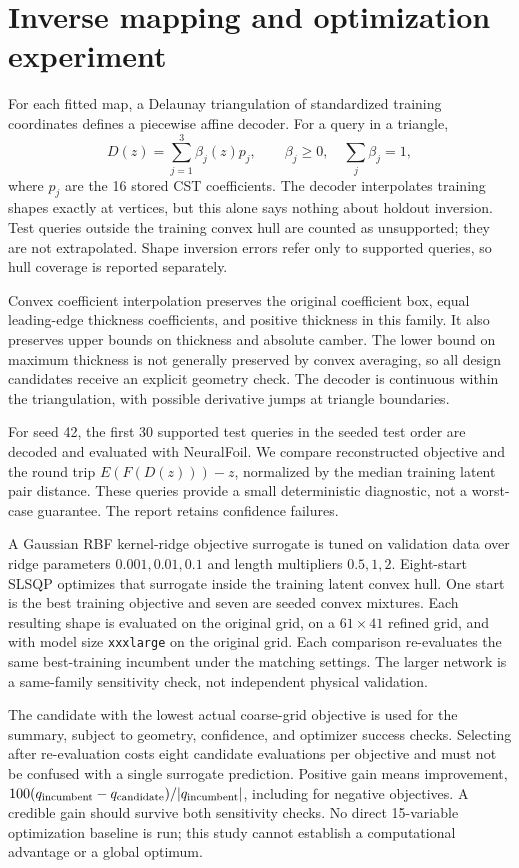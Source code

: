 \documentclass[11pt,a4paper]{article}
\begin{document}
\section{Inverse mapping and optimization experiment}
For each fitted map, a Delaunay triangulation of standardized training coordinates defines a piecewise affine decoder. For a query in a triangle,
\[
 D(z)=\sum_{j=1}^{3}\beta_j(z)p_j,\qquad \beta_j\geq0,\quad\sum_j\beta_j=1,
\]
where $p_j$ are the 16 stored CST coefficients. The decoder interpolates training shapes exactly at vertices, but this alone says nothing about holdout inversion. Test queries outside the training convex hull are counted as unsupported; they are not extrapolated. Shape inversion errors refer only to supported queries, so hull coverage is reported separately.

Convex coefficient interpolation preserves the original coefficient box, equal leading-edge thickness coefficients, and positive thickness in this family. It also preserves upper bounds on thickness and absolute camber. The lower bound on maximum thickness is not generally preserved by convex averaging, so all design candidates receive an explicit geometry check. The decoder is continuous within the triangulation, with possible derivative jumps at triangle boundaries.

For seed 42, the first 30 supported test queries in the seeded test order are decoded and evaluated with NeuralFoil. We compare reconstructed objective and the round trip $E(F(D(z)))-z$, normalized by the median training latent pair distance. These queries provide a small deterministic diagnostic, not a worst-case guarantee. The report retains confidence failures.

A Gaussian RBF kernel-ridge objective surrogate is tuned on validation data over ridge parameters $0.001,0.01,0.1$ and length multipliers $0.5,1,2$. Eight-start SLSQP optimizes that surrogate inside the training latent convex hull. One start is the best training objective and seven are seeded convex mixtures. Each resulting shape is evaluated on the original grid, on a $61\times41$ refined grid, and with model size \texttt{xxxlarge} on the original grid. Each comparison re-evaluates the same best-training incumbent under the matching settings. The larger network is a same-family sensitivity check, not independent physical validation.

The candidate with the lowest actual coarse-grid objective is used for the summary, subject to geometry, confidence, and optimizer success checks. Selecting after re-evaluation costs eight candidate evaluations per objective and must not be confused with a single surrogate prediction. Positive gain means improvement, $100(q_{\rm incumbent}-q_{\rm candidate})/|q_{\rm incumbent}|$, including for negative objectives. A credible gain should survive both sensitivity checks. No direct 15-variable optimization baseline is run; this study cannot establish a computational advantage or a global optimum.
\end{document}
